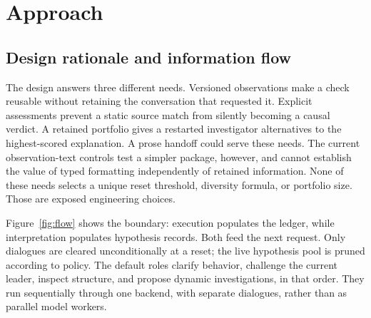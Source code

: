 \documentclass[letterpaper,journal]{IEEEtran}
\begin{document}
\section{Approach}\label{sec:approach}
\subsection{Design rationale and information flow}
The design answers three different needs. Versioned observations make a check reusable without retaining the conversation that requested it. Explicit assessments prevent a static source match from silently becoming a causal verdict. A retained portfolio gives a restarted investigator alternatives to the highest-scored explanation. A prose handoff could serve these needs. The current observation-text controls test a simpler package, however, and cannot establish the value of typed formatting independently of retained information. None of these needs selects a unique reset threshold, diversity formula, or portfolio size. Those are exposed engineering choices.

Figure~\ref{fig:flow} shows the boundary: execution populates the ledger, while interpretation populates hypothesis records. Both feed the next request. Only dialogues are cleared unconditionally at a reset; the live hypothesis pool is pruned according to policy. The default roles clarify behavior, challenge the current leader, inspect structure, and propose dynamic investigations, in that order. They run sequentially through one backend, with separate dialogues, rather than as parallel model workers.
\end{document}
